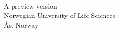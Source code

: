 \makeatletter
\begin{titlepage}
{\Huge
\noindent
\@title}
\end{titlepage}

\cleardoublepage

\thispagestyle{empty}
\vfill
{\Huge
\noindent
\@title
}\\[0.5in]
{\Large
\noindent
\@author
}
\vfill
{\large
\noindent
A preview version\\
Norwegian University of Life Sciences\\
\AA s, Norway
}\\[1in]
\makeatother

